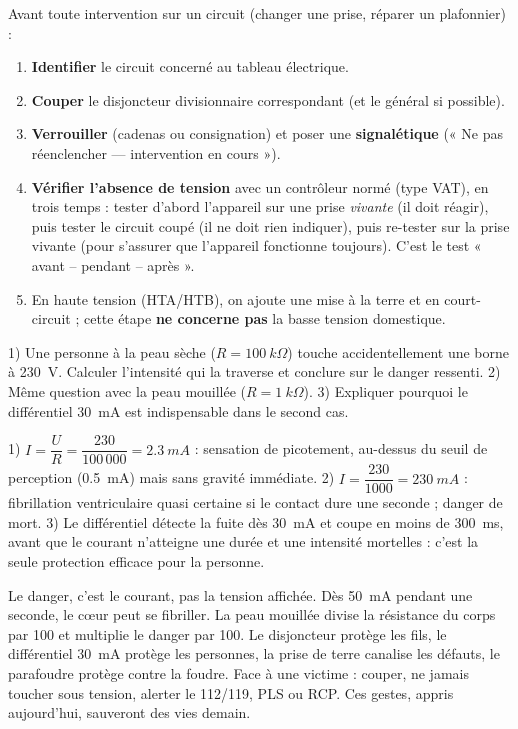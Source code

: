 \documentclass[11pt]{article}
\newcommand{\cle}[1]{{\popxbold\color{popdark}#1}}
\begin{document}
\begin{methode}
Avant toute intervention sur un circuit (changer une prise, réparer un plafonnier) :
\begin{enumerate}
\item \textbf{Identifier} le circuit concerné au tableau électrique.
\item \textbf{Couper} le disjoncteur divisionnaire correspondant (et le général si possible).
\item \textbf{Verrouiller} (cadenas ou consignation) et poser une \textbf{signalétique} (« Ne pas réenclencher — intervention en cours »).
\item \textbf{Vérifier l'absence de tension} avec un contrôleur normé (type VAT), en trois temps : tester d'abord l'appareil sur une prise \emph{vivante} (il doit réagir), puis tester le circuit coupé (il ne doit rien indiquer), puis re-tester sur la prise vivante (pour s'assurer que l'appareil fonctionne toujours). C'est le test « avant -- pendant -- après ».
\item En haute tension (HTA/HTB), on ajoute une mise à la terre et en court-circuit ; cette étape \textbf{ne concerne pas} la basse tension domestique.
\end{enumerate}
\end{methode}

\begin{exercice}
1) Une personne à la peau sèche ($R = \SI{100}{k\Omega}$) touche accidentellement une borne à \SI{230}{V}. Calculer l'intensité qui la traverse et conclure sur le danger ressenti. 2) Même question avec la peau mouillée ($R = \SI{1}{k\Omega}$). 3) Expliquer pourquoi le différentiel \SI{30}{mA} est indispensable dans le second cas.
\end{exercice}

\begin{corrige}[Exercice]
1) $I = \dfrac{U}{R} = \dfrac{230}{100\,000} = \SI{2,3}{mA}$ : sensation de picotement, au-dessus du seuil de perception (\SI{0,5}{mA}) mais sans gravité immédiate. 2) $I = \dfrac{230}{1000} = \SI{230}{mA}$ : fibrillation ventriculaire quasi certaine si le contact dure une seconde ; danger de mort. 3) Le différentiel détecte la fuite dès \SI{30}{mA} et coupe en moins de \SI{300}{ms}, avant que le courant n'atteigne une durée et une intensité mortelles : c'est la seule protection efficace pour la personne.
\end{corrige}

\begin{aretenir}
Le danger, c'est le \cle{courant}, pas la tension affichée. Dès \SI{50}{mA} pendant une seconde, le cœur peut se fibriller. La peau mouillée divise la résistance du corps par 100 et multiplie le danger par 100. Le \cle{disjoncteur} protège les fils, le \cle{différentiel \SI{30}{mA}} protège les personnes, la \cle{prise de terre} canalise les défauts, le \cle{parafoudre} protège contre la foudre. Face à une victime : couper, ne jamais toucher sous tension, alerter le 112/119, PLS ou RCP. Ces gestes, appris aujourd'hui, sauveront des vies demain.
\end{aretenir}
\end{document}
